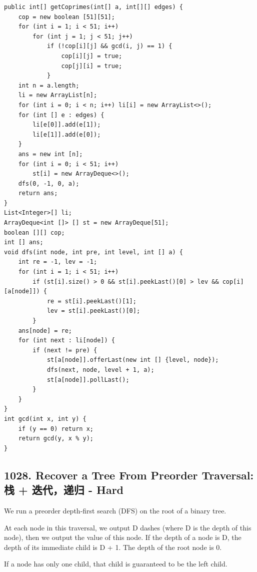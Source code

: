 \documentclass[9pt, b5paaper]{book}
\begin{document}
\begin{enumerate}
\begin{itemize}
\begin{itemize}
\begin{verbatim}
public int[] getCoprimes(int[] a, int[][] edges) {
    cop = new boolean [51][51];
    for (int i = 1; i < 51; i++) 
        for (int j = 1; j < 51; j++) 
            if (!cop[i][j] && gcd(i, j) == 1) {
                cop[i][j] = true;
                cop[j][i] = true;
            }
    int n = a.length;
    li = new ArrayList[n];
    for (int i = 0; i < n; i++) li[i] = new ArrayList<>();
    for (int [] e : edges) {
        li[e[0]].add(e[1]);
        li[e[1]].add(e[0]);
    }
    ans = new int [n];
    for (int i = 0; i < 51; i++) 
        st[i] = new ArrayDeque<>();
    dfs(0, -1, 0, a);
    return ans;
}
List<Integer>[] li;
ArrayDeque<int []> [] st = new ArrayDeque[51];
boolean [][] cop;
int [] ans;
void dfs(int node, int pre, int level, int [] a) {
    int re = -1, lev = -1;
    for (int i = 1; i < 51; i++) 
        if (st[i].size() > 0 && st[i].peekLast()[0] > lev && cop[i][a[node]]) {
            re = st[i].peekLast()[1];
            lev = st[i].peekLast()[0];
        }
    ans[node] = re;
    for (int next : li[node]) {
        if (next != pre) {
            st[a[node]].offerLast(new int [] {level, node});
            dfs(next, node, level + 1, a);
            st[a[node]].pollLast();
        }
    }
}
int gcd(int x, int y) {
    if (y == 0) return x;
    return gcd(y, x % y);
}
\end{verbatim}
\end{itemize}
\end{itemize}
\end{enumerate}
\subsection{1028. Recover a Tree From Preorder Traversal: 栈 + 迭代，递归 - Hard}
\label{sec-3-0-4}
We run a preorder depth-first search (DFS) on the root of a binary tree.

At each node in this traversal, we output D dashes (where D is the depth of this node), then we output the value of this node.  If the depth of a node is D, the depth of its immediate child is D + 1.  The depth of the root node is 0.

If a node has only one child, that child is guaranteed to be the left child.
\end{document}
